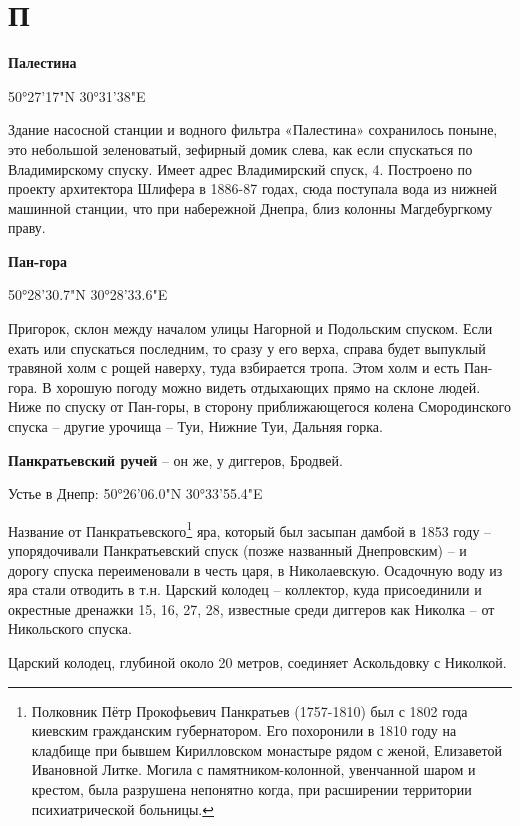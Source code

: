 \chapter*{П}

\textbf{Палестина}

50°27'17"N 30°31'38"E

Здание насосной станции и водного фильтра «Палестина» сохранилось поныне, это небольшой зеленоватый, зефирный домик слева, как если спускаться по Владимирскому спуску. Имеет адрес Владимирский спуск, 4. Построено по проекту архитектора Шлифера в 1886-87 годах, сюда поступала вода из нижней машинной станции, что при набережной Днепра, близ колонны Магдебургкому праву.

\medskip

\textbf{Пан-гора}

50°28'30.7"N 30°28'33.6"E

Пригорок, склон между началом улицы Нагорной и Подольским спуском. Если ехать или спускаться последним, то сразу у его верха, справа будет выпуклый травяной холм с рощей наверху, туда взбирается тропа. Этом холм и есть Пан-гора. В хорошую погоду можно видеть отдыхающих прямо на склоне людей. Ниже по спуску от Пан-горы, в сторону приближающегося колена Смородинского спуска – другие урочища – Туи, Нижние Туи, Дальняя горка.\\

\medskip

\textbf{Панкратьевский ручей} – он же, у диггеров, Бродвей.

Устье в Днепр: 50°26'06.0"N 30°33'55.4"E

Название от Панкратьевского\footnote{Полковник Пётр Прокофьевич Панкратьев (1757-1810) был с 1802 года киевским гражданским губернатором. Его похоронили в 1810 году на кладбище при бывшем Кирилловском монастыре рядом с женой, Елизаветой Ивановной Литке. Могила с памятником-колонной, увенчанной шаром и крестом, была разрушена непонятно когда, при расширении территории психиатрической больницы.} яра, который был засыпан дамбой в 1853 году – упорядочивали Панкратьевский спуск (позже названный Днепровским) – и дорогу спуска переименовали в честь царя, в Николаевскую. Осадочную воду из яра стали отводить в т.н. Царский колодец – коллектор, куда присоединили и окрестные дренажки 15, 16, 27, 28, известные среди диггеров как Николка – от Никольского спуска.

Царский колодец, глубиной около 20 метров, соединяет Аскольдовку с Николкой.\\ 

